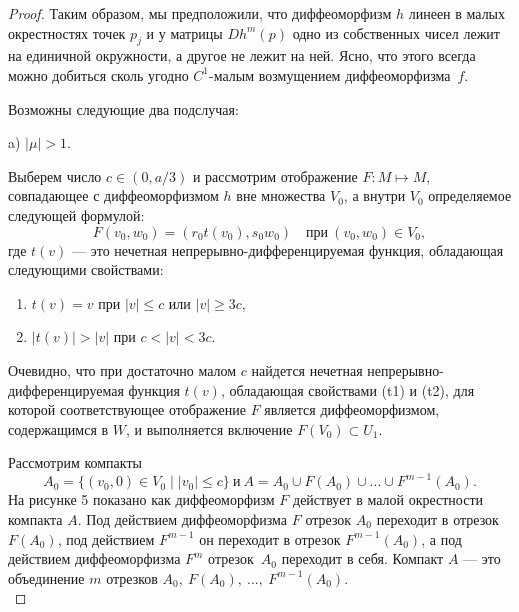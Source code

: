 \documentclass[12pt]{article}
\begin{document}
\begin{proof}
Таким образом, мы предположили, что диффеоморфизм $h$ линеен в малых окрестностях точек $p_j$ и у матрицы $Dh^m(p)$ одно из собственных чисел лежит на единичной окружности, а другое не лежит на ней. Ясно, что этого всегда можно добиться сколь угодно $C^1$-малым возмущением диффеоморфизма~$f$.

Возможны следующие два подслучая:

a) $|\mu|>1$.

Выберем число $c\!\in\!\left(0,a/3\right)$ и рассмотрим отображение $F:M\mapsto M$, совпадающее с диффеоморфизмом $h$ вне множества $V_0$, а внутри $V_0$ определяемое следующей формулой:
\begin{equation}
\label{4.19}
F(v_0,w_0)=\left(r_0t(v_0),s_0w_0\right)\quad \textrm{при}\ (v_0,w_0)\in V_0,
\end{equation}
где $t(v)$ --- это нечетная непрерывно-дифференцируемая функция, обладающая следующими свойствами:
\begin{enumerate}
\item[(t1)] $t(v)=v$ при $|v|\leq c$ или $|v|\geq 3c$,
\item[(t2)] $|t(v)|>|v|$ при $c<|v|<3c$.
\end{enumerate}

Очевидно, что при достаточно малом $c$ найдется нечетная непрерывно-дифферен\-цируемая функция $t(v)$, обладающая свойствами (t1) и (t2), для которой соответствующее отображение $F$ является диффеоморфизмом, содержащимся в $W$, и выполняется включение $F(V_0)\subset U_1$.

Рассмотрим компакты 
$$A_0=\{(v_0,0)\!\in\! V_0\mid |v_0|\leq c\}\ \textrm{и} \ A=A_0\cup F(A_0)\cup\ldots\cup F^{m-1}(A_0).$$
На рисунке 5 показано как диффеоморфизм $F$ действует в малой окрестности компакта $A$.
 Под действием диффеоморфизма $F$ отрезок $A_0$ переходит в отрезок $F(A_0)$, под действием $F^{m-1}$ он переходит в отрезок $F^{m-1}(A_0)$, а под действием диффеоморфизма $F^m$ отрезок~$A_0$ переходит в себя. Компакт $A$ --- это объединение $m$ отрезков $A_0,\ F(A_0),\ \ldots,\ F^{m-1}(A_0)$.
\\


\end{proof}
\end{document}
